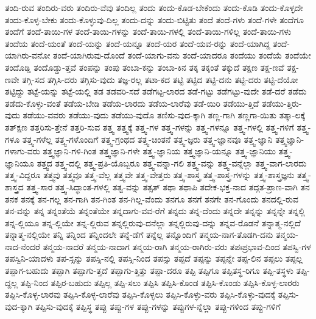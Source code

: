 {ತಂದಿ-ರುವ
ತಂದಿರು-ವರು
ತಂದಿರು-ವೆವು
ತಂದಿಲ್ಲ
ತಂದು
ತಂದು-ಕೊಡ-ಬೇಕೆಂದು
ತಂದು-ಕೊಡಿ
ತಂದು-ಕೊಳ್ಳದೇ
ತಂದು-ಕೊಳ್ಳ-ಬೇಕು
ತಂದು-ಕೊಳ್ಳುವು-ದಿಲ್ಲ
ತಂದು-ದನ್ನು
ತಂದು-ಬಿಟ್ಟಿತು
ತಂದೆ
ತಂದೆ-ಗಳು
ತಂದೆ-ಗಳೇ
ತಂದೆಗೂ
ತಂದೆಗೆ
ತಂದೆ-ತಾಯಿ-ಗಳ
ತಂದೆ-ತಾಯಿ-ಗಳನ್ನು
ತಂದೆ-ತಾಯಿ-ಗಳಲ್ಲಿ
ತಂದೆ-ತಾಯಿ-ಗಳಿಲ್ಲ
ತಂದೆ-ತಾಯಿ-ಗಳು
ತಂದೆಯ
ತಂದೆ-ಯಂತೆ
ತಂದೆ-ಯನ್ನು
ತಂದೆ-ಯನ್ನೂ
ತಂದೆ-ಯರ
ತಂದೆ-ಯವ-ರನ್ನು
ತಂದೆ-ಯಾಗಿದ್ದ
ತಂದೆ-ಯಾಗಿರು-ವನೋ
ತಂದೆ-ಯಾಗಿರುವು-ದೊಂದೆ
ತಂದೆ-ಯಾಗು-ವನು
ತಂದೆ-ಯಾದರೂ
ತಂದೆಯು
ತಂದೆಯೆ
ತಂದೆಯೇ
ತಂದೊಡ್ಡಿ
ತಂದೊಡ್ಡು-ತ್ತವೆ
ತಂಪನ್ನು
ತಂಪು
ತಂಬಾ-ಕನ್ನು
ತಂಬಾ-ಕಿನ
ತಕ್ಕ
ತಕ್ಕಂತೆ
ತಕ್ಕುದೆ
ತಕ್ಷಣ
ತಕ್ಷ-ಣವೆ
ತಕ್ಷ-ಣವೇ
ತಗ್ಗಿ-ಸದ
ತಗ್ಗಿಸಿ-ದರು
ತಗ್ಗಿಸು-ವುದು
ತಜ್ಞ-ರಲ್ಲ
ತಟಾ-ಕದ
ತಟ್ಟಿ
ತಟ್ಟಿದ
ತಟ್ಟಿ-ದನು
ತಟ್ಟಿ-ದರು
ತಟ್ಟಿ-ದೆಯೋ
ತಟ್ಟಿದ್ದು
ತಟ್ಟೆ-ಯನ್ನು
ತಟ್ಟೆ-ಯಲ್ಲಿ
ತಡ
ತಡವರಿ-ಸದೆ
ತಡೆಗಟ್ಟ-ಲಾರದ
ತಡೆ-ಗಟ್ಟು
ತಡೆಗಟ್ಟು-ವುದೇ
ತಡೆ-ದರೆ
ತಡೆದು
ತಡೆದು-ಕೊಳ್ಳು-ವಂತೆ
ತಡೆಯ-ಬೇಡಿ
ತಡೆಯ-ಲಾರದು
ತಡೆಯ-ಲಾರೆವು
ತಡೆ-ಯಿರಿ
ತಡೆಯು-ತ್ತಿದೆ
ತಡೆಯು-ತ್ತಿರು-ವುದು
ತಡೆಯು-ವವರು
ತಡೆಯು-ವುದು
ತಡೆಯು-ವುದೊ
ತಣಿಸು-ವುದ-ಕ್ಕಾಗಿ
ತಣ್ಣ-ಗಾಗಿ
ತಣ್ಣಗಾ-ಯಿತು
ತತ್ಕಾ-ಲಕ್ಕೆ
ತತ್ಕ್ಷಣ
ತತ್ತರಿಸು-ತ್ತೇನೆ
ತತ್ತರಿ-ಸುವ
ತತ್ತ್ವ
ತತ್ತ್ವಕ್ಕೆ
ತತ್ತ್ವ-ಗಳ
ತತ್ತ್ವ-ಗಳನ್ನು
ತತ್ತ್ವ-ಗಳನ್ನೂ
ತತ್ತ್ವ-ಗಳಲ್ಲಿ
ತತ್ತ್ವ-ಗಳಿಗೆ
ತತ್ತ್ವ-ಗಳೂ
ತತ್ತ್ವ-ಗಳೆಲ್ಲ
ತತ್ತ್ವ-ಗಳೊಂದಿಗೆ
ತತ್ತ್ವ-ಗ್ರಂಥದ
ತತ್ತ್ವ-ಚಿಂತನೆ
ತತ್ತ್ವ-ಜ್ಞರು
ತತ್ತ್ವ-ಜ್ಞಾನವೂ
ತತ್ತ್ವ-ಜ್ಞಾನಿ
ತತ್ತ್ವಜ್ಞಾನಿ-ಗಳಾಗು-ವರು
ತತ್ತ್ವಜ್ಞಾನಿ-ಗಳಿ-ಗಿಂತ
ತತ್ತ್ವಜ್ಞಾನಿ-ಗಳೇ
ತತ್ತ್ವ-ಜ್ಞಾನಿಯ
ತತ್ತ್ವಜ್ಞಾನಿ-ಯನ್ನೂ
ತತ್ತ್ವ-ಜ್ಞಾನಿಯು
ತತ್ತ್ವ-ಜ್ಞಾನಿಯೂ
ತತ್ತ್ವದ
ತತ್ತ್ವ-ದಲ್ಲಿ
ತತ್ತ್ವ-ಪ್ರತಿ-ಯೊಬ್ಬರೂ
ತತ್ತ್ವ-ವನ್ನಾ-ಗಲಿ
ತತ್ತ್ವ-ವನ್ನು
ತತ್ತ್ವ-ವನ್ನೆಲ್ಲಾ
ತತ್ತ್ವ-ವಾಗ-ಲಾರದು
ತತ್ತ್ವ-ವಿದ್ದರೂ
ತತ್ತ್ವವು
ತತ್ತ್ವವೂ
ತತ್ತ್ವ-ವೆಲ್ಲ
ತತ್ತ್ವವೇ
ತತ್ತ್ವ-ವೇತ್ತರು
ತತ್ತ್ವ-ಶಾಸ್ತ್ರ
ತತ್ತ್ವ-ಶಾಸ್ತ್ರ-ಗಳನ್ನು
ತತ್ತ್ವ-ಶಾಸ್ತ್ರಜ್ಞನು
ತತ್ತ್ವ-ಶಾಸ್ತ್ರದ
ತತ್ತ್ವ-ಸಾರ
ತತ್ತ್ವ-ಸಿದ್ಧಾಂತ-ಗಳಲ್ಲಿ
ತತ್ವ-ವನ್ನು
ತತ್ಸತ್
ತಥಾ
ತಥಾಪಿ
ತದೇಕ-ಭಕ್ತ-ನಾದ
ತದ್ಗತ-ಪ್ರಾಣ-ವಾಗಿ
ತನ
ತನಕ
ತನಕ್ಕೆ
ತನ-ಗಲ್ಲ
ತನ-ಗಾಗಿ
ತನ-ಗಿಂತ
ತನ-ಗಿಲ್ಲ-ವೆಂದು
ತನಗೂ
ತನಗೆ
ತನಗೇ
ತನ-ಗೊಂದು
ತನದಲ್ಲಿ-ರುವ
ತನ-ವನ್ನು
ತನ್ನ
ತನ್ನಂತೆಯೆ
ತನ್ನಂತೆಯೇ
ತನ್ನದಾಗು-ವವ-ರೆಗೆ
ತನ್ನದು
ತನ್ನ-ದೆಂದು
ತನ್ನದೇ
ತನ್ನನ್ನು
ತನ್ನನ್ನೇ
ತನ್ನಲ್ಲಿ
ತನ್ನ-ಲ್ಲಿಯೂ
ತನ್ನ-ಲ್ಲಿಯೇ
ತನ್ನ-ಲ್ಲಿರುವ
ತನ್ನಲ್ಲಿರುವು-ದನೆಲ್ಲಾ
ತನ್ನಲ್ಲಿರುವು-ದನ್ನು
ತನ್ನವ-ರೊಡನೆ
ತನ್ನಾತ್ಮ-ನಲ್ಲಿದೆ
ತನ್ನಾತ್ಮ-ನಲ್ಲಿಯೇ
ತನ್ನಿ
ತನ್ನಿಂದ
ತನ್ನಿಂದಲೇ
ತನ್ನೆ-ಡೆಗೆ
ತನ್ನೆಲ್ಲ
ತನ್ನೊಂದಿಗೆ
ತನ್ಮಯ-ನಾಗ-ತೊಡಗಿ-ದನು
ತನ್ಮಯ-ನಾದ-ನೆಂದರೆ
ತನ್ಮಯ-ನಾದರೆ
ತನ್ಮಯ-ನಾದಾಗ
ತನ್ಮಯ-ರಾಗಿ
ತನ್ಮಯ-ರಾಗಿರು-ವರು
ತಪಃಪ್ರಭಾವ-ದಿಂದ
ತಪಸ್ವಿ-ಗಳ
ತಪಸ್ವಿನಿ-ಯಾದಳು
ತಪ-ಸ್ಸನ್ನು
ತಪಸ್ಸಿ-ನಲ್ಲಿ
ತಪಸ್ಸಿ-ನಿಂದ
ತಪಸ್ಸು
ತಪ್ಪದೆ
ತಪ್ಪನ್ನು
ತಪ್ಪನ್ನೇ
ತಪ್ಪ-ಲಿನ
ತಪ್ಪಲು
ತಪ್ಪಲ್ಲ
ತಪ್ಪಾಗ-ಬಹುದು
ತಪ್ಪಾಗಿ
ತಪ್ಪಾಗು-ತ್ತದೆ
ತಪ್ಪಾಗು-ತ್ತಿತ್ತು
ತಪ್ಪಾ-ದರೂ
ತಪ್ಪಿ
ತಪ್ಪಿಗೂ
ತಪ್ಪಿತಸ್ಥ-ರಿಗೂ
ತಪ್ಪಿ-ತಸ್ಥಳು
ತಪ್ಪಿ-ದ್ದಲ್ಲ
ತಪ್ಪಿ-ನಿಂದ
ತಪ್ಪಿರ-ಬಹುದು
ತಪ್ಪಿಲ್ಲ
ತಪ್ಪಿ-ಸಲು
ತಪ್ಪಿಸಿ
ತಪ್ಪಿಸಿ-ಕೊಂಡ
ತಪ್ಪಿಸಿ-ಕೊಂಡು
ತಪ್ಪಿಸಿ-ಕೊಳ್ಳ-ಲಾರರು
ತಪ್ಪಿಸಿ-ಕೊಳ್ಳ-ಲಾರವು
ತಪ್ಪಿಸಿ-ಕೊಳ್ಳ-ಲಾರೆವು
ತಪ್ಪಿಸಿ-ಕೊಳ್ಳಲು
ತಪ್ಪಿಸಿ-ಕೊಳ್ಳು-ವರು
ತಪ್ಪಿಸಿ-ಕೊಳ್ಳು-ವುದಕ್ಕೆ
ತಪ್ಪಿಸು-ವುದ-ಕ್ಕಾಗಿ
ತಪ್ಪಿಸು-ವುದಕ್ಕೆ
ತಪ್ಪಿಸ್ಥ
ತಪ್ಪು
ತಪ್ಪು-ಗಳ
ತಪ್ಪು-ಗಳನ್ನು
ತಪ್ಪುಗಳ-ನ್ನೆಲ್ಲಾ
ತಪ್ಪು-ಗಳಿಂದ
ತಪ್ಪು-ಗಳಿಗೆ
}
